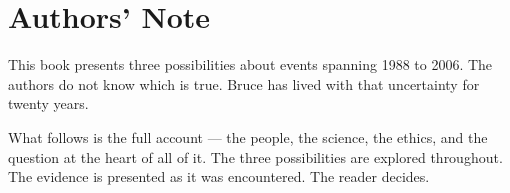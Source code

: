 
\chapter*{Authors' Note}

This book presents three possibilities about events spanning 1988 to 2006. The authors do not know which is true. Bruce has lived with that uncertainty for twenty years.

What follows is the full account --- the people, the science, the ethics, and the question at the heart of all of it. The three possibilities are explored throughout. The evidence is presented as it was encountered. The reader decides.
